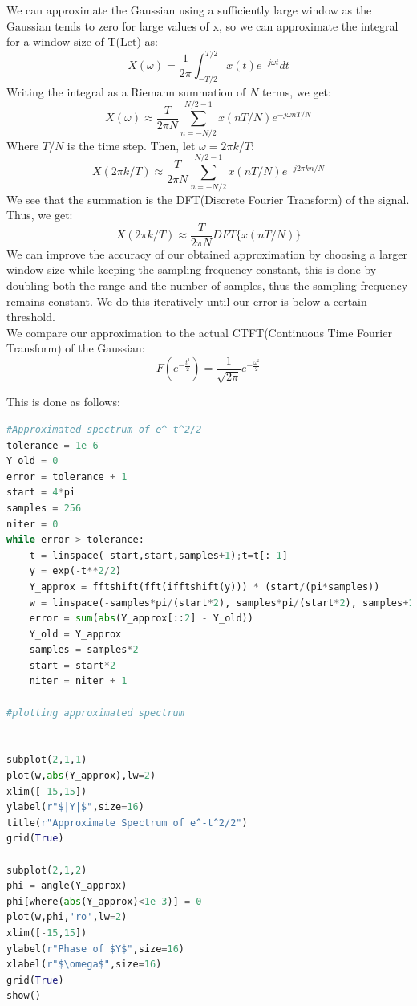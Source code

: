 \documentclass[11pt, a4paper]{article}
\begin{document}
We can approximate the Gaussian using a sufficiently large window as the Gaussian tends to zero for large values of x, so we can approximate the integral for a window size of T(Let) as:
\begin{equation*}
    X(\omega) = \frac{1}{2\pi} \int_{-T/2}^{T/2} x(t) e^{-j\omega t} dt
\end{equation*}
Writing the integral as a Riemann summation of $N$ terms, we get:
\begin{equation*}
    X(\omega) \approx \frac{T}{2\pi N} \sum_{n = -N/2}^{N/2 - 1} x(nT/N) e^{-j\omega nT / N}
\end{equation*}
Where $T / N$ is the time step. Then, let $\omega = 2\pi k / T$:
\begin{equation*}
    X(2\pi k / T) \approx \frac{T}{2\pi N} \sum_{n = -N/2}^{N/2 - 1} x(nT/N) e^{-j2\pi kn/N}
\end{equation*}
We see that the summation is the DFT(Discrete Fourier Transform) of the signal. Thus, we get:
\begin{equation*}
    X(2\pi k / T) \approx \frac{T}{2\pi N} DFT\{x(nT/N)\}
\end{equation*}
We can improve the accuracy of our obtained approximation by choosing a larger window size while keeping the sampling frequency constant, this is done by doubling both the range and the number of samples, thus the sampling frequency remains constant. We do this iteratively until our error is below a certain threshold.\\

We compare our approximation to the actual CTFT(Continuous Time Fourier Transform) of the Gaussian:
\begin{equation*}
    F(e^{-\frac{t^2}{2}}) = \frac{1}{\sqrt{2\pi}}e^{-\frac{\omega^2}{2}}
\end{equation*}

This is done as follows:
\begin{lstlisting}[language = Python]
#Approximated spectrum of e^-t^2/2
tolerance = 1e-6
Y_old = 0
error = tolerance + 1
start = 4*pi
samples = 256
niter = 0
while error > tolerance:
    t = linspace(-start,start,samples+1);t=t[:-1]
    y = exp(-t**2/2)
    Y_approx = fftshift(fft(ifftshift(y))) * (start/(pi*samples))
    w = linspace(-samples*pi/(start*2), samples*pi/(start*2), samples+1); w=w[:-1]
    error = sum(abs(Y_approx[::2] - Y_old))
    Y_old = Y_approx
    samples = samples*2
    start = start*2
    niter = niter + 1

#plotting approximated spectrum


subplot(2,1,1)
plot(w,abs(Y_approx),lw=2)
xlim([-15,15])
ylabel(r"$|Y|$",size=16)
title(r"Approximate Spectrum of e^-t^2/2")
grid(True)

subplot(2,1,2)
phi = angle(Y_approx)
phi[where(abs(Y_approx)<1e-3)] = 0
plot(w,phi,'ro',lw=2)
xlim([-15,15])
ylabel(r"Phase of $Y$",size=16)
xlabel(r"$\omega$",size=16)
grid(True)
show()
\end{lstlisting}
\end{document}
